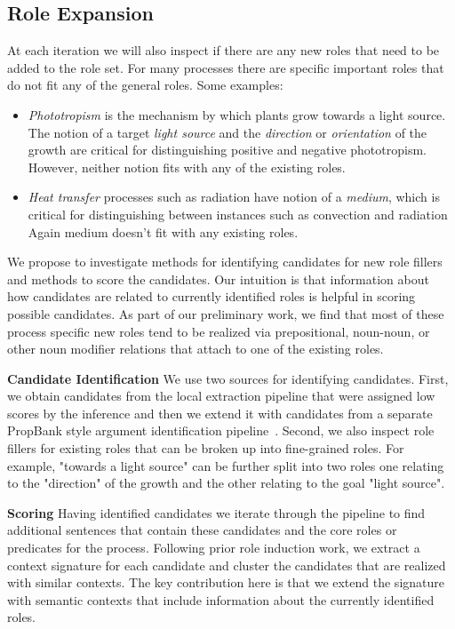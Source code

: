 \subsection{Role Expansion}

At each iteration we will also inspect if there are any new roles that need to be added to the role set.
For many processes there are specific important roles that do not fit any of the general roles. Some examples:
	\begin{itemize}[noitemsep,nolistsep]
		\item {\em Phototropism} is the mechanism by which plants grow towards a light source. 
		The notion of a target {\em light source} and the {\em direction} or {\em orientation} of the growth
		are critical for distinguishing positive and negative phototropism. However, neither notion fits
		with any of the existing roles. 
	\item {\em Heat transfer} processes such as radiation have notion of a {\em medium}, 
		which is critical for distinguishing between instances such as convection and radiation
		Again medium doesn't fit with any existing roles. 
	\end{itemize}

We propose to investigate methods for identifying candidates for new role fillers and methods to score the candidates. 
Our intuition is that information about how candidates are related to currently identified roles is helpful in scoring possible candidates. 
As part of our preliminary work, we find that most of these process specific new roles tend to be realized via prepositional, noun-noun, or other noun modifier relations that attach to one of the existing roles. 

{\bf Candidate Identification} We use two sources for identifying candidates. First, we obtain candidates from the local extraction pipeline that were assigned low scores by the inference and then we extend it with candidates from a separate PropBank style argument identification pipeline~\cite{lang-naacl2010}. Second, we also inspect role fillers for existing roles that can be broken up into fine-grained roles. For example, "towards a light source" can be further split into two roles one relating to the "direction" of the growth and the other relating to the goal "light source".

{\bf Scoring} Having identified candidates we iterate through the pipeline to find additional sentences that contain these candidates and the core roles or predicates for the process. Following prior role induction work, we extract a context signature for each candidate and cluster the candidates that are realized with similar contexts. 
The key contribution here is that we extend the signature with semantic contexts that include information about the currently identified roles. 








